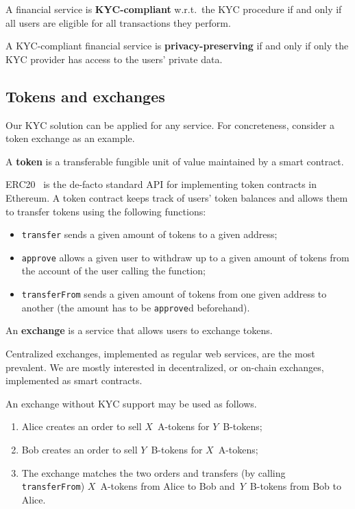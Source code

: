 \begin{definition}
	A financial service is \textbf{KYC-compliant} w.r.t.~the KYC procedure if and only if all users are eligible for all transactions they perform.
\end{definition}

\begin{definition}
	A KYC-compliant financial service is \textbf{privacy-preserving} if and only if only the KYC provider has access to the users' private data.
\end{definition}


\subsection{Tokens and exchanges}

Our KYC solution can be applied for any service.
For concreteness, consider a token exchange as an example.

\begin{definition}
	A \textbf{token} is a transferable fungible unit of value maintained by a smart contract.
\end{definition}

ERC20~\cite{Victor2019} is the de-facto standard API for implementing token contracts in Ethereum.
A token contract keeps track of users' token balances and allows them to transfer tokens using the following functions:

\begin{itemize}
	\item \texttt{transfer} sends a given amount of tokens to a given address;
	\item \texttt{approve} allows a given user to withdraw up to a given amount of tokens from the account of the user calling the function;
	\item \texttt{transferFrom} sends a given amount of tokens from one given address to another (the amount has to be \texttt{approve}d beforehand).
\end{itemize}

\begin{definition}
	An \textbf{exchange} is a service that allows users to exchange tokens.
\end{definition}

Centralized exchanges, implemented as regular web services, are the most prevalent.
We are mostly interested in decentralized, or on-chain exchanges, implemented as smart contracts.

An exchange without KYC support may be used as follows.
\begin{enumerate}
	\item Alice creates an order to sell $X$~A-tokens for $Y$~B-tokens;
	\item Bob creates an order to sell $Y$~B-tokens for $X$~A-tokens;
	\item The exchange matches the two orders and transfers (by calling \texttt{transferFrom}) $X$~A-tokens from Alice to Bob and~$Y$~B-tokens from Bob to Alice.
\end{enumerate}


